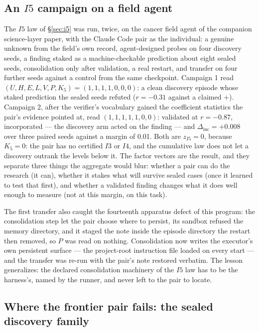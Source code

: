 \subsection{An $I5$ campaign on a field agent}\label{sec:i5results}

The $I5$ law of \S\ref{sec:i5} was run, twice, on the cancer field agent of the companion science-layer paper, with the Claude Code pair as the individual: a genuine unknown from the field's own record, agent-designed probes on four discovery seeds, a finding staked as a machine-checkable prediction about eight sealed seeds, consolidation only after validation, a real restart, and transfer on four further seeds against a control from the same checkpoint. Campaign 1 read $(U,H,E,L,V,P,K_5) = (1,1,1,1,0,0,0)$: a clean discovery episode whose staked prediction the sealed seeds refuted ($r = -0.31$ against a claimed $+$). Campaign 2, after the verifier's vocabulary gained the coefficient statistics the pair's evidence pointed at, read $(1,1,1,1,1,0,0)$: validated at $r = -0.87$, incorporated --- the discovery arm acted on the finding --- and $\Delta_{\mathrm{inc}} = +0.008$ over three paired seeds against a margin of 0.01. Both are $z_{I5} = 0$, because $K_5 = 0$: the pair has no certified $I3$ or $I4$, and the cumulative law does not let a discovery outrank the levels below it. The factor vectors are the result, and they separate three things the aggregate would blur: whether a pair can do the research (it can), whether it stakes what will survive sealed cases (once it learned to test that first), and whether a validated finding changes what it does well enough to measure (not at this margin, on this task).

The first transfer also caught the fourteenth apparatus defect of this program: the consolidation step let the pair choose where to persist, its sandbox refused the memory directory, and it staged the note inside the episode directory the restart then removed, so $P$ was read on nothing. Consolidation now writes the executor's own persistent surface --- the project-root instruction file loaded on every start --- and the transfer was re-run with the pair's note restored verbatim. The lesson generalizes: the declared consolidation machinery of the $I5$ law has to be the harness's, named by the runner, and never left to the pair to locate.

\subsection{Where the frontier pair fails: the sealed discovery family}

